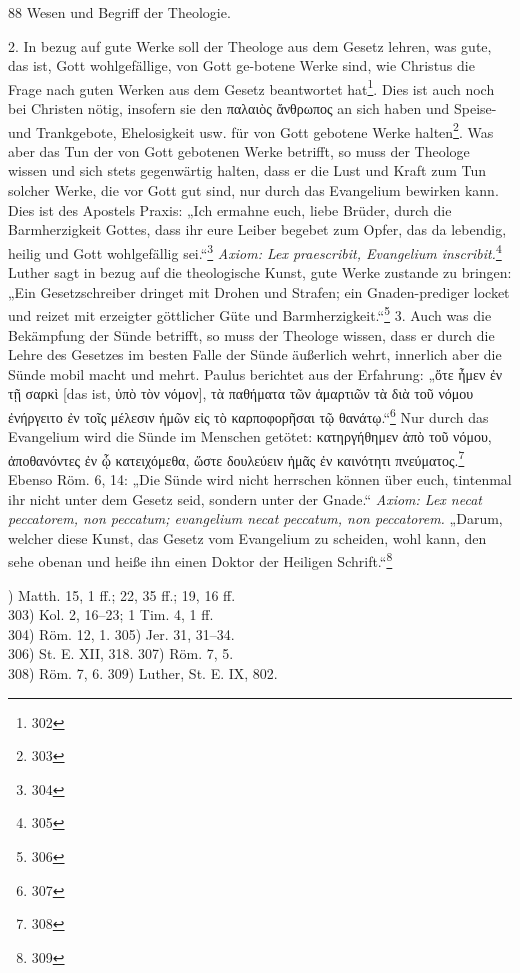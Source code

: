 \centerline{88 \hspace{4cm} Wesen und Begriff der Theologie.}
\vspace{0.5cm}
2. In bezug auf gute Werke soll der Theologe aus dem Gesetz lehren, was gute, das ist, Gott wohlgefällige, von Gott ge-botene Werke sind, wie Christus die Frage nach guten Werken aus dem Gesetz beantwortet hat\footnote{302}. Dies ist auch noch bei Christen nötig, insofern sie den \textgreek{παλαιὸς ἄνθρωπος} an sich haben und Speise- und Trankgebote, Ehelosigkeit usw. für von Gott gebotene Werke halten\footnote{303}. Was aber das Tun der von Gott gebotenen Werke betrifft, so muss der Theologe wissen und sich stets gegenwärtig halten, dass er die Lust und Kraft zum Tun solcher Werke, die vor Gott gut sind, nur durch das Evangelium bewirken kann. Dies ist des Apostels Praxis: „Ich ermahne euch, liebe Brüder, durch die Barmherzigkeit Gottes, dass ihr eure Leiber begebet zum Opfer, das da lebendig, heilig und Gott wohlgefällig sei.“\footnote{304} \emph{Axiom: Lex praescribit, Evangelium inscribit.}\footnote{305} Luther sagt in bezug auf die theologische Kunst, gute Werke zustande zu bringen: „Ein Gesetzschreiber dringet mit Drohen und Strafen; ein Gnaden-prediger locket und reizet mit erzeigter göttlicher Güte und Barmherzigkeit.“\footnote{306}
\vspace{0.5cm}
3. Auch was die Bekämpfung der Sünde betrifft, so muss der Theologe wissen, dass er durch die Lehre des Gesetzes im besten Falle der Sünde äußerlich wehrt, innerlich aber die Sünde mobil macht und mehrt. Paulus berichtet aus der Erfahrung: „\textgreek{ὅτε ἦμεν ἐν τῇ σαρκὶ [das ist, ὑπὸ τὸν νόμον], τὰ παθήματα τῶν ἁμαρτιῶν τὰ διὰ τοῦ νόμου ἐνήργειτο ἐν τοῖς μέλεσιν ἡμῶν εἰς τὸ καρποφορῆσαι τῷ θανάτῳ}.“\footnote{307} Nur durch das Evangelium wird die Sünde im Menschen getötet: \textgreek{κατηργήθημεν ἀπὸ τοῦ νόμου, ἀποθανόντες ἐν ᾧ κατειχόμεθα, ὥστε δουλεύειν ἡμᾶς ἐν καινότητι πνεύματος}.\footnote{308} Ebenso Röm. 6, 14: „Die Sünde wird nicht herrschen können über euch, tintenmal ihr nicht unter dem Gesetz seid, sondern unter der Gnade.“ \emph{Axiom: Lex necat peccatorem, non peccatum; evangelium necat peccatum, non peccatorem.} „Darum, welcher diese Kunst, das Gesetz vom Evangelium zu scheiden, wohl kann, den sehe obenan und heiße ihn einen Doktor der Heiligen Schrift.“\footnote{309}
\vspace{0.5cm}
\begin{footnotesize}
) Matth. 15, 1 ff.; 22, 35 ff.; 19, 16 ff.\\
303) Kol. 2, 16--23; 1 Tim. 4, 1 ff.\\
304) Röm. 12, 1. \hspace{3.5cm} 305) Jer. 31, 31--34.\\
306) St. E. XII, 318. \hspace{3.5cm} 307) Röm. 7, 5.\\
308) Röm. 7, 6. \hspace{3.5cm} 309) Luther, St. E. IX, 802.
\end{footnotesize}